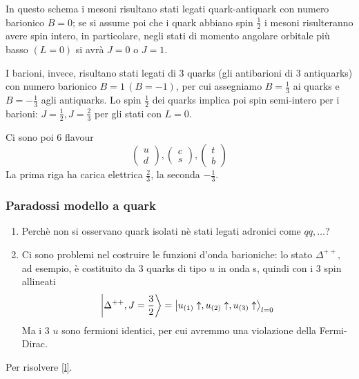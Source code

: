 \documentclass[10pt,a4paper]{article}
\theoremstyle{definition}
\begin{document}
In questo schema i mesoni risultano stati legati quark-antiquark con numero barionico \(B = 0\); se si assume poi che i quark abbiano spin \(\frac12\) i mesoni risulteranno avere spin intero, in particolare, negli stati di momento angolare orbitale più basso \((L = 0)\) si avrà \(J = 0\) o \(J = 1\).

I barioni, invece, risultano stati legati di 3 quarks (gli antibarioni di 3 antiquarks) con numero barionico \(B = 1\, (B = -1)\), per cui assegniamo \(B = \frac13\) ai quarks e \(B = -\frac13\) agli antiquarks. Lo spin \(\frac12\) dei quarks implica poi spin semi-intero per i barioni: \(J = \frac12, J = \frac23\) per gli stati con \(L = 0\).

Ci sono poi 6 flavour
\[
\begin{pmatrix}
u \\ d    
\end{pmatrix}
,
\begin{pmatrix}
    c \\ s
\end{pmatrix}
,
\begin{pmatrix}
    t \\ b 
\end{pmatrix}
\]
La prima riga ha carica elettrica \(\frac23\), la seconda \(-\frac13\).

\subsubsection{Paradossi modello a quark}
\begin{enumerate}
    \item Perchè non si osservano quark isolati nè stati legati adronici come $qq, \dots$?
    \item Ci sono problemi nel costruire le funzioni d'onda barioniche: lo stato \(\Delta^{++}\), ad esempio, è costituito da 3 quarks di tipo \(u\) in onda s, quindi con i 3 spin allineati
    \[
    \ket{\Delta^{++}, J = \frac32} = \ket{u_{(1)}\uparrow, u_{(2)}\uparrow, u_{(3)}\uparrow}_{l = 0} 
    \] 
    Ma i 3 \(u\) sono fermioni identici, per cui avremmo una violazione della Fermi-Dirac. \label{l}
\end{enumerate}
Per risolvere \ref*{l}. 
\end{document}
